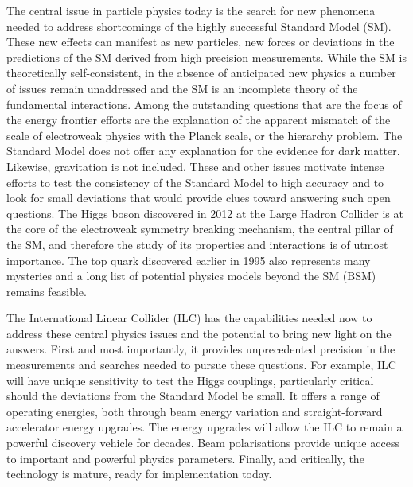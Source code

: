 \documentclass[%
 reprint,
 amsmath,amssymb,
 aps,
]{revtex4-1}
\begin{document}
The central issue in particle physics today is the search for new phenomena needed to address shortcomings of the highly successful Standard Model (SM).  These new effects can manifest as new particles, new forces or deviations in the predictions of the SM derived from high precision measurements. While the SM is theoretically self-consistent, in the absence of anticipated new physics a number of issues remain unaddressed and the SM is an incomplete theory of the fundamental interactions. Among the outstanding questions that are the focus of the energy frontier efforts are the explanation of the apparent mismatch of the scale of electroweak physics with the Planck scale, or the hierarchy problem. The Standard Model does not offer any explanation for the evidence for dark matter. Likewise, gravitation is not included.  These and other issues motivate intense efforts to test the consistency of the Standard Model to high accuracy and to look for small deviations that would provide clues toward answering such open questions. The Higgs boson discovered in 2012 at the Large Hadron Collider is at the core of the electroweak symmetry breaking mechanism, the central pillar of the SM, and therefore the study of its properties and interactions is of utmost importance. The top quark discovered earlier in 1995 also represents many mysteries and a long list of potential physics models beyond the SM (BSM) remains feasible. 



The International Linear Collider (ILC) has the capabilities needed now to address these central physics issues and the potential to bring new light on the answers.  First and most importantly, it provides unprecedented precision in the measurements and searches needed to pursue these questions.  For example, ILC will have unique sensitivity to test the 
Higgs couplings, particularly critical should the deviations 
from the Standard Model be small. It offers a range of 
operating energies, both through beam energy variation 
and straight-forward accelerator energy upgrades.  
The energy upgrades will allow the ILC to remain a powerful 
discovery vehicle for decades. Beam polarisations provide 
unique access to important and powerful physics parameters. 
Finally, and critically, the technology is mature, 
ready for implementation today.
\end{document}

